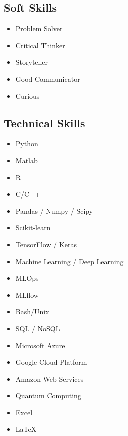 \documentclass[10pt,a4paper,sans]{moderncv}        %
\begin{document}
\subsection{Soft Skills}
\vspace{-1.25em}
\begin{multicols}{2}
\begin{itemize}
\item Problem Solver
\item Critical Thinker
\item Storyteller
\item Good Communicator 
\item Curious
\end{itemize}
\end{multicols}

\subsection{Technical Skills}
\vspace{-1.25em}
\begin{multicols}{2}
\begin{itemize}
\item Python  \hfill {}
\item Matlab  \hfill {}
\item R  \hfill {}
\item C/C++  \hfill {}
\item Pandas / Numpy / Scipy \hfill {}
\item Scikit-learn \hfill {}
\item TensorFlow / Keras \hfill {}
\item Machine Learning / Deep Learning \hfill {}
\item MLOps \hfill {}
\item MLflow \hfill {}
\item Bash/Unix \hfill {}
\item SQL / NoSQL \hfill {}
\item Microsoft Azure \hfill {}
\item Google Cloud Platform \hfill {}
\item Amazon Web Services \hfill {}
\item Quantum Computing  \hfill {}
\item Excel \hfill {}
\item \LaTeX \hfill {}
\end{itemize}
\end{multicols}
\end{document}
